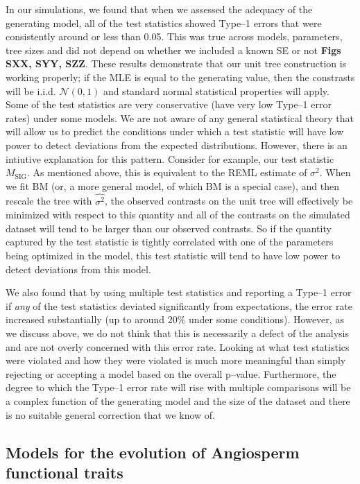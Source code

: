 \documentclass[a4paper,11pt]{article}
\begin{document}
In our simulations, we found that when we assessed the adequacy of the generating model, all of the test statistics showed Type--1 errors that were consistently around or less than 0.05. This was true across models, parameters, tree sizes and did not depend on whether we included a known SE or not \textbf{Figs SXX, SYY, SZZ}. These results demonstrate that our unit tree construction is working properly; if the MLE is equal to the generating value, then the constrasts will be i.i.d. $\mathcal{N}(0,1)$ and standard normal statistical properties will apply. Some of the test statistics are very conservative (have very low Type--1 error rates) under some models. We are not aware of any general statistical theory that will allow us to predict the conditions under which a test statistic will have low power to detect deviations from the expected distributions. However, there is an intiutive explanation for this pattern. Consider for example, our test statistic $M_{\text{SIG}}$. As mentioned above, this is equivalent to the REML estimate of $\sigma^2$. When we fit BM (or, a more general model, of which BM is a special case), and then rescale the tree with $\hat{\sigma^2}$, the observed contrasts on the unit tree will effectively be minimized with respect to this quantity and all of the contrasts on the simulated dataset will tend to be larger than our observed contrasts. So if the quantity captured by the test statistic is tightly correlated with one of the parameters being optimized in the model, this test statistic will tend to have low power to detect deviations from this model.

We also found that by using multiple test statistics and reporting a Type--1 error if \emph{any} of the test statistics deviated significantly from expectations, the error rate increased substantially (up to around 20\% under some conditions). However, as we discuss above, we do not think that this is necessarily a defect of the analysis and are not overly concerned with this error rate. Looking at what test statistics were violated and how they were violated is much more meaningful than simply rejecting or accepting a model based on the overall p--value. Furthermore, the degree to which the Type--1 error rate will rise with multiple comparisons will be a complex function of the generating model and the size of the dataset and there is no suitable general correction that we know of.

\subsection{Models for the evolution of Angiosperm functional traits}
\end{document}
